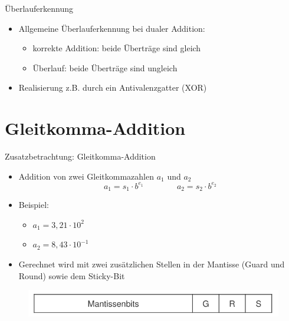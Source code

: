 \documentclass[12pt%
,xcolor=table
,aspectratio=169%
]{beamer}
\begin{document}
\begin{frame}{Überlauferkennung}
\begin{itemize}
	\item Allgemeine Überlauferkennung bei dualer Addition:
	\begin{itemize}
		\item korrekte Addition: beide Überträge sind gleich
		\item Überlauf: beide Überträge sind ungleich
	\end{itemize}
	\item Realisierung z.B. durch ein Antivalenzgatter (XOR)
\end{itemize}
\end{frame}

\section{Gleitkomma-Addition}

\begin{frame}{Zusatzbetrachtung: Gleitkomma-Addition}
	\begin{itemize}
		\item Addition von zwei Gleitkommazahlen $a_1$ und $a_2$
		$$
			a_1 = s_1 \cdot b^{e_1} \qquad \qquad a_2 = s_2 \cdot b^{e_2}
		$$
		\item Beispiel:
		\begin{itemize}
			\item $a_1 = 3,21 \cdot 10^2$
			\item $a_2 = 8,43 \cdot 10^{-1}$
		\end{itemize}
		\item Gerechnet wird mit zwei zusätzlichen Stellen in der Mantisse (Guard und Round) sowie dem Sticky-Bit
	\end{itemize}
	\begin{figure}
	\center
	\includegraphics[scale=0.3]{pictures/mantisse}
	\end{figure}
\end{frame}
\end{document}
